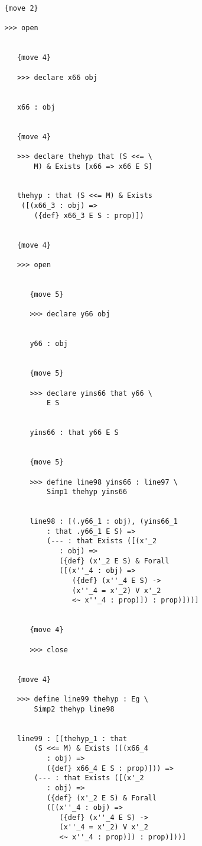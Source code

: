 \documentclass{article}
\begin{document}
\begin{verbatim}
         {move 2}

         >>> open


            {move 4}

            >>> declare x66 obj


            x66 : obj


            {move 4}

            >>> declare thehyp that (S <<= \
                M) & Exists [x66 => x66 E S]


            thehyp : that (S <<= M) & Exists 
             ([(x66_3 : obj) => 
                ({def} x66_3 E S : prop)])


            {move 4}

            >>> open


               {move 5}

               >>> declare y66 obj


               y66 : obj


               {move 5}

               >>> declare yins66 that y66 \
                   E S


               yins66 : that y66 E S


               {move 5}

               >>> define line98 yins66 : line97 \
                   Simp1 thehyp yins66


               line98 : [(.y66_1 : obj), (yins66_1 
                   : that .y66_1 E S) => 
                   (--- : that Exists ([(x'_2 
                      : obj) => 
                      ({def} (x'_2 E S) & Forall 
                      ([(x''_4 : obj) => 
                         ({def} (x''_4 E S) -> 
                         (x''_4 = x'_2) V x'_2 
                         <~ x''_4 : prop)]) : prop)]))]


               {move 4}

               >>> close


            {move 4}

            >>> define line99 thehyp : Eg \
                Simp2 thehyp line98


            line99 : [(thehyp_1 : that 
                (S <<= M) & Exists ([(x66_4 
                   : obj) => 
                   ({def} x66_4 E S : prop)])) => 
                (--- : that Exists ([(x'_2 
                   : obj) => 
                   ({def} (x'_2 E S) & Forall 
                   ([(x''_4 : obj) => 
                      ({def} (x''_4 E S) -> 
                      (x''_4 = x'_2) V x'_2 
                      <~ x''_4 : prop)]) : prop)]))]



\end{verbatim}
\end{document}
